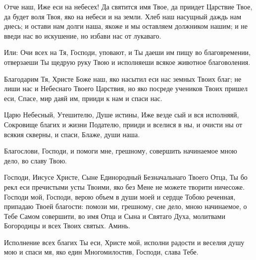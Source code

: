 \nopagebreak\bigskip\bigskip\mychapterending

 


Oтче наш, Иже еси на небесех! Да святится имя Твое, да приидет Царствие Твое, да будет воля Твоя, яко на небеси и на земли. Хлеб наш насущный даждь нам днесь; и остави нам долги наша, якоже и мы оставляем должником нашим; и не введи нас во искушение, но избави нас от лукаваго.


\itshape 


Или:\normalfont{} Очи всех на Тя, Господи, уповают, и Ты даеши им пищу во благовремении, отверзаеши Ты щедрую руку Твою и исполняеши всякое животное благоволения.
\nopagebreak\bigskip\bigskip\mychapterending

 


Благодарим Тя, Христе Боже наш, яко насытил еси нас земных Твоих благ; не лиши нас и Небеснаго Твоего Царствия, но яко посреде учеников Твоих пришел еси, Спасе, мир даяй им, прииди к нам и спаси нас.
\nopagebreak\bigskip\bigskip\mychapterending

 



Царю Небесный, Утешителю, Душе истины, Иже везде сый и вся исполняяй, Сокровище благих и жизни Подателю, прииди и вселися в ны, и очисти ны от всякия скверны, и спаси, Блаже, души наша.


    Благослови, Господи, и помоги мне, грешному, совершить начинаемое мною дело, во славу Твою.


    Господи, Иисусе Христе, Сыне Единородный Безначальнаго Твоего Отца, Ты бо рекл еси пречистыми усты Твоими, яко без Мене не можете творити ничесоже. Господи мой, Господи, верою объем в души моей и сердце Тобою реченная, припадаю Твоей благости: помози ми, грешному, сие дело, мною начинаемое, о Тебе Самом совершити, во имя Отца и Сына и Святаго Духа, молитвами Богородицы и всех Твоих святых. Аминь.
\nopagebreak\bigskip\bigskip\mychapterending

 



Исполнение всех благих Ты еси, Христе мой, исполни радости и веселия душу мою и спаси мя, яко един Многомилостив, Господи, слава Тебе.


